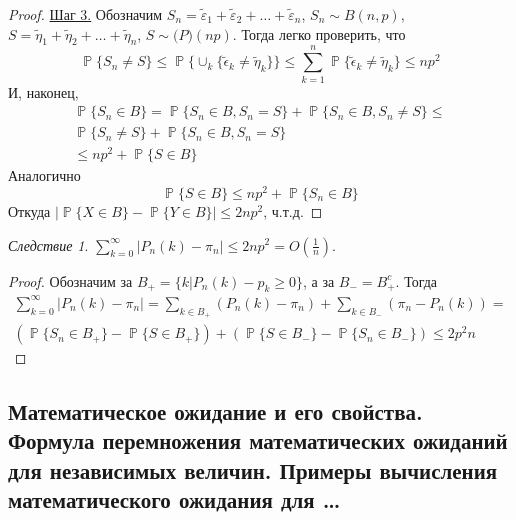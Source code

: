 \documentclass[a4paper,100pt]{article}
\theoremstyle{indented}
\theoremstyle{definition}
\theoremstyle{remark}
\newtheorem{cons}{Следствие}
\DeclareMathOperator{\PP}{\mathbb{P}}
\begin{document}
\begin{proof}
    \underline{Шаг 3.}
        Обозначим $S_n = \tilde \varepsilon_1 + \tilde \varepsilon_2 + \dots + \tilde \varepsilon_n$, $S_n \sim B(n, p)$, 
        $S = \tilde \eta_1 + \tilde \eta_2 + \dots + \tilde \eta_n$, $S \sim \mathcal(P)(np).$
        Тогда легко проверить, что 
        \begin{equation*}
          \PP\{ S_n \neq S \} \le 
          \PP \{ \cup_k \{ \tilde \epsilon_k \ne \tilde \eta_k \} \} \le 
          \sum_{k=1}^n \PP\{ \tilde \epsilon_k \ne \tilde \eta_k \} 
          \le np^2
        \end{equation*}
        И, наконец, 
        \begin{equation*}
          \begin{split}
            \PP \{ S_n \in B\} =  \PP \{ S_n \in B, S_n = S\} +  \PP \{ S_n \in B, S_n \ne S\} \le \\
            \PP \{ S_n \ne S\} +  \PP \{ S_n \in B, S_n = S\}\\
            \le np^2 +  \PP \{ S \in B\}
          \end{split}
        \end{equation*}
        Аналогично 
        \begin{equation*}
          \PP \{ S \in B\} \le np^2 +  \PP \{ S_n \in B\}
        \end{equation*}
        Откуда 
        $|\PP\{X \in B\} - \PP \{ Y \in B \}|\leq 2np^2$, ч.т.д.
\end{proof}

\begin{cons}
  $\sum_{k=0}^\infty|P_n(k)-\pi_n|\leq 2np^2 = O(\frac{1}{n})$.
\end{cons}
\begin{proof}
  Обозначим за $B_+ = \{k| P_n(k) - p_k \ge 0 \}$, а за $B_- = B_+^c$. Тогда 
  \begin{equation*}
      \begin{split}
          \sum_{k=0}^\infty \left| P_n(k)-\pi_n \right| = 
          \sum_{k \in B_+} (P_n(k)-\pi_n) + \sum_{k \in B_-} (\pi_n - P_n(k)) = \\
          \left( \PP \{ S_n \in B_+\} - \PP \{S \in B_+ \} \right) + \left(\PP \{ S \in B_-\} - \PP \{S_n \in B_- \}\right) \le 2p^2n
      \end{split}
  \end{equation*}
\end{proof}

\subsection{Математическое ожидание и его свойства. Формула перемножения математических ожиданий для независимых величин. Примеры вычисления математического ожидания для \ldots} 
\end{document}
